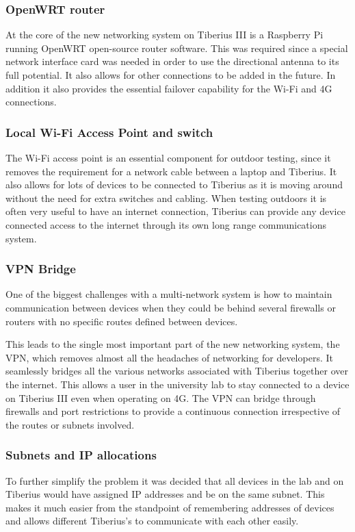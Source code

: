 \subsubsection{OpenWRT router}
At the core of the new networking system on Tiberius III is a Raspberry Pi running OpenWRT open-source router software. This was required since a special network interface card was needed in order to use the directional antenna to its full potential. It also allows for other connections to be added in the future. In addition it also provides the essential failover capability for the Wi-Fi and 4G connections.

\subsubsection{Local Wi-Fi Access Point and switch}
The Wi-Fi access point is an essential component for outdoor testing, since it removes the requirement for a network cable between a laptop and Tiberius. It also allows for lots of devices to be connected to Tiberius as it is moving around without the need for extra switches and cabling. When testing outdoors it is often very useful to have an internet connection, Tiberius can  provide any device connected access to the internet through its own long range communications system.

\subsubsection{VPN Bridge} 
One of the biggest challenges with a multi-network system is how to maintain communication between devices when they could be behind several firewalls or routers with no specific routes defined between devices.

This leads to the single most important part of the new networking system, the VPN, which removes almost all the headaches of networking for developers. It seamlessly bridges all the various networks associated with Tiberius together over the internet. This allows a user in the university lab to stay connected to a device on Tiberius III even when operating on 4G. The VPN can bridge through firewalls and port restrictions to provide a continuous connection irrespective of the routes or subnets involved.

\subsubsection{Subnets and IP allocations}
To further simplify the problem it was decided that all devices in the lab and on Tiberius would have assigned IP addresses and be on the same subnet. This makes it much easier from the standpoint of remembering addresses of devices and allows different Tiberius's to communicate with each other easily.

